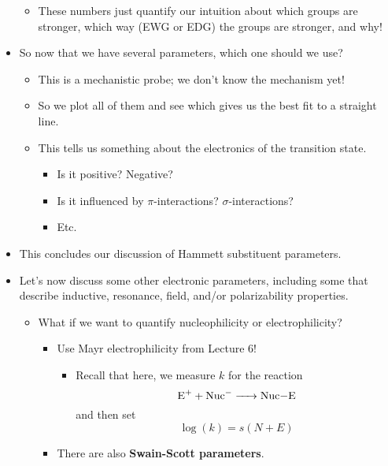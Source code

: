 \documentclass[../notes.tex]{subfiles}
\begin{document}
\begin{itemize}
\begin{itemize}
        \item These numbers just quantify our intuition about which groups are stronger, which way (EWG or EDG) the groups are stronger, and why!
    \end{itemize}
    \item So now that we have several parameters, which one should we use?
    \begin{itemize}
        \item This is a mechanistic probe; we don't know the mechanism yet!
        \item So we plot all of them and see which gives us the best fit to a straight line.
        \item This tells us something about the electronics of the transition state.
        \begin{itemize}
            \item Is it positive? Negative?
            \item Is it influenced by $\pi$-interactions? $\sigma$-interactions?
            \item Etc.
        \end{itemize}
    \end{itemize}
    \item This concludes our discussion of Hammett substituent parameters.
    \pagebreak
    \item Let's now discuss some other electronic parameters, including some that describe inductive, resonance, field, and/or polarizability properties.
    \begin{itemize}
        \item What if we want to quantify nucleophilicity or electrophilicity?
        \begin{itemize}
            \item Use Mayr electrophilicity from Lecture 6!
            \begin{itemize}
                \item Recall that here, we measure $k$ for the reaction
                \begin{equation*}
                    \ce{E+ + Nuc- -> Nuc-E}
                \end{equation*}
                and then set
                \begin{equation*}
                    \log(k) = s(N+E)
                \end{equation*}
            \end{itemize}
            \item There are also \textbf{Swain-Scott parameters}.

\end{itemize}
\end{itemize}
\end{itemize}
\end{document}
